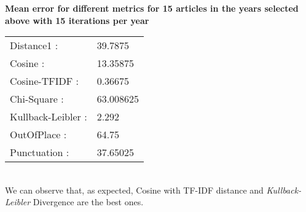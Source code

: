 \textbf{Mean error for different metrics for 15 articles in the years selected above with 15 iterations per year}\\
\begin{tabular}{p{3cm} p{5cm}}
    Distance1 :& 39.7875\\
    Cosine :& 13.35875\\
    Cosine-TFIDF :& 0.36675\\
    Chi-Square :& 63.008625\\
    Kullback-Leibler :& 2.292\\
    OutOfPlace :& 64.75\\
    Punctuation :& 37.65025\\
\end{tabular}\\

We can observe that, as expected, Cosine with TF-IDF distance and \emph{Kullback-Leibler} Divergence are the best ones.\\

